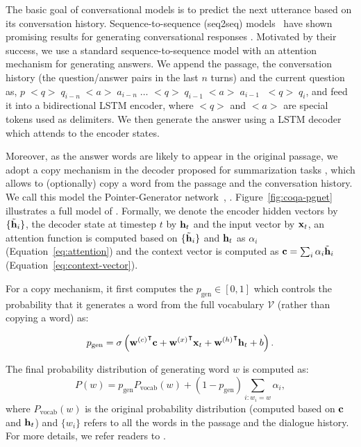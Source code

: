 The basic goal of conversational models is to predict the next utterance based on its conversation history. Sequence-to-sequence (seq2seq) models~\cite{sutskever2014sequence} have shown promising results for generating conversational responses \cite{vinyals2015neural,li2016diversity,zhang2018personalizing}. Motivated by their success, we use a standard sequence-to-sequence model with an attention mechanism for generating answers. We append the passage, the conversation history (the question/answer pairs in the last $n$ turns) and the current question as, $p\; \mathrm{<}q\mathrm{>}\; q_{i-n} \;\mathrm{<}a\mathrm{>}\; a_{i-n}\; \ldots$ $\mathrm{<}q\mathrm{>}\; q_{i-1} \;\mathrm{<}a\mathrm{>}\; a_{i-1}\;$  $\mathrm{<}q\mathrm{>}\;q_i$, and feed it into a bidirectional LSTM encoder, where $\mathrm{<}q\mathrm{>}$ and $\mathrm{<}a\mathrm{>}$ are special tokens used as delimiters. We then generate the answer using a LSTM decoder which attends to the encoder states.

Moreover, as the answer words are likely to appear in the original passage, we adopt a copy mechanism in the decoder proposed for summarization tasks \cite{gu2016incorporating,see2017get}, which allows to (optionally) copy a word from the passage and the conversation history. We call this model the Pointer-Generator network~\cite{see2017get}, . Figure~\ref{fig:coqa-pgnet} illustrates a full model of . Formally, we denote the encoder hidden vectors by $\{\tilde{\mathbf{h}}_i\}$, the decoder state at timestep $t$ by $\mathbf{h}_t$ and the input vector by $\mathbf{x}_t$, an attention function is computed based on $\{\tilde{\mathbf{h}}_i\}$ and $\mathbf{h}_t$  as $\alpha_i$ (Equation~\ref{eq:attention}) and the context vector is computed as $\mathbf{c} = \sum_{i}{\alpha_i \tilde{\mathbf{h}}_i}$ (Equation~\ref{eq:context-vector}).

For a copy mechanism, it first computes the  $p_{\text{gen}} \in [0, 1]$ which controls the probability that it generates a word from the full vocabulary $\mathcal{V}$ (rather than copying a word) as:

\begin{equation}
    p_{\text{gen}} = \sigma\left({\mathbf{w}^{(c)}}^{\intercal}\mathbf{c} + {\mathbf{w}^{(x)}}^{\intercal}\mathbf{x}_t + {\mathbf{w}^{(h)}}^{\intercal}\mathbf{h}_t + b\right).
\end{equation}

The final probability distribution of generating word $w$ is computed as:
\begin{equation}
    P(w) = p_{\text{gen}}P_{\text{vocab}}(w) + (1 - p_{\text{gen}})\sum_{i: w_i = w}\alpha_i,
\end{equation}
where $P_{\text{vocab}}(w)$ is the original probability distribution (computed based on $\mathbf{c}$ and $\mathbf{h}_t$) and $\{w_i\}$ refers to all the words in the passage and the dialogue history. For more details, we refer readers to \cite{see2017get}.



